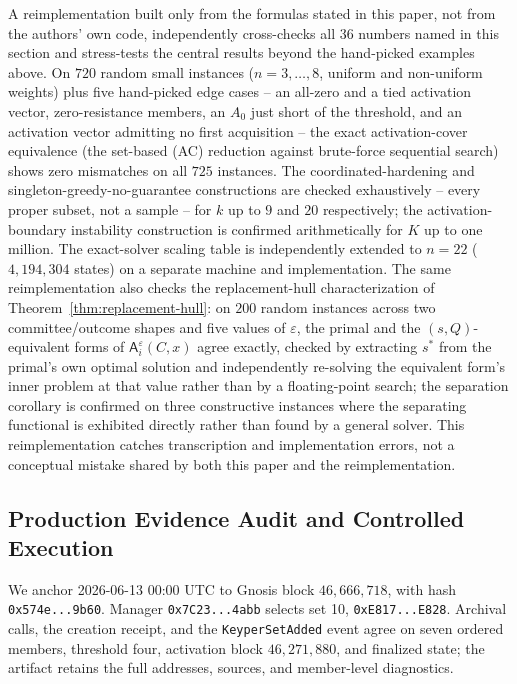 A reimplementation built only from the formulas stated in this paper, not
from the authors' own code, independently cross-checks all 36 numbers named
in this section and stress-tests the central results beyond the hand-picked
examples above. On \(720\) random small instances (\(n=3,\ldots,8\), uniform
and non-uniform weights) plus five hand-picked edge cases -- an all-zero and a
tied activation vector, zero-resistance members, an \(A_0\) just short of the
threshold, and an activation vector admitting no first acquisition -- the
exact activation-cover equivalence (the set-based (AC) reduction against
brute-force sequential search) shows zero mismatches on all \(725\) instances.
The coordinated-hardening and singleton-greedy-no-guarantee constructions are
checked exhaustively -- every proper subset, not a sample -- for \(k\) up to
\(9\) and \(20\) respectively; the activation-boundary instability
construction is confirmed arithmetically for \(K\) up to one million. The
exact-solver scaling table is independently extended to \(n=22\)
(\(4{,}194{,}304\) states) on a separate machine and implementation. The same
reimplementation also checks the replacement-hull characterization of
Theorem~\ref{thm:replacement-hull}: on \(200\) random instances across two
committee/outcome shapes and five values of \(\varepsilon\), the primal and
the \((s,Q)\)-equivalent forms of \(\mathsf A_i^\varepsilon(C,x)\) agree
exactly, checked by extracting \(s^*\) from the primal's own optimal solution
and independently re-solving the equivalent form's inner problem at that
value rather than by a floating-point search; the separation corollary is
confirmed on three constructive instances where the separating functional is
exhibited directly rather than found by a general solver. This
reimplementation catches transcription and implementation errors, not a
conceptual mistake shared by both this paper and the reimplementation.

\subsection{Production Evidence Audit and Controlled Execution}
\label{subsec:public-threshold-cap}
\label{subsec:bonded-slashing-pilot}
\label{subsec:public-input-audit}

We anchor 2026-06-13 00:00 UTC to Gnosis block
\(46{,}666{,}718\), with hash \texttt{0x574e...9b60}. Manager
\texttt{0x7C23...4abb} selects set 10,
\texttt{0xE817...E828}. Archival calls, the creation receipt, and the
\texttt{KeyperSetAdded} event agree on seven ordered members, threshold four,
activation block \(46{,}271{,}880\), and finalized state; the artifact retains
the full addresses, sources, and member-level diagnostics.


